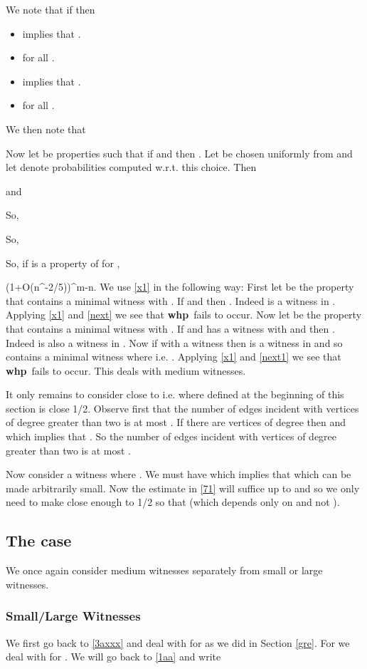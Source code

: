 \documentclass[11pt]{article}
\def\cP{{\cal P}}
\def\whp{{\bf whp}}
\def\cG{{\cal G}}
\newcommand{\ignore}[1]{}
\newcommand{\beq}[1]{}
\begin{document}
We note that if
 then
\begin{itemize}
 \item  implies that .
\item  for all .
\item  implies that .
\item  for all .
\end{itemize}
We then note that
\ignore{

}

Now let  be properties such that if  and  then . Let 
be chosen uniformly from  and let  denote probabilities computed w.r.t. this choice. Then

and

So,

So,

So, if  is a property of  for , 
\beq{x1}
\frac{|\cP_m|}{\cG(n,m)}\leq (1+O(n^{-2/5}))^{m-n}\frac{|\cP_n|}{\cG(n,n+n^{4/5})}.
\eeq
We use \eqref{x1} in the following way: First let  be the property that  
contains a minimal witness  with .
If  and  then . 
Indeed  is a witness in .
Applying \eqref{x1} and \eqref{next} we see that 
\whp\  fails to occur. 
Now let  be the property that  contains a minimal
witness  with . 
If  and  has a 
witness  with  and  
then . Indeed  is 
also a witness in . Now if  with a witness
 then  is a witness in  and so contains 
a minimal witness  where 
 i.e. .
Applying \eqref{x1} and \eqref{next1} we see that 
\whp\  fails to occur. 
This deals with medium witnesses.


It only remains to consider  close to  i.e. where  defined at the beginning of this section 
is close 1/2. Observe first that the number of edges incident
with vertices of degree greater than two is at most .
If there are  vertices of degree  then  and  which implies that .
So the number of edges incident with vertices of degree greater than two is at most .

Now consider a witness  where . We must have
 which implies that  which can be made arbitrarily small.
Now the estimate in \eqref{71} will suffice up to  and so we only need to make  close enough to 1/2 so that
 (which depends only on  and not ). 
\subsection{The case }\label{le}
We once again consider medium witnesses separately from small or large witnesses.
\subsubsection{Small/Large Witnesses}\label{smallww}
We first go back to \eqref{3axxx} and deal with  for  as we did in Section \ref{gre}. 
For  we deal with  for . We will go back to \eqref{1aa} and write 
\end{document}
